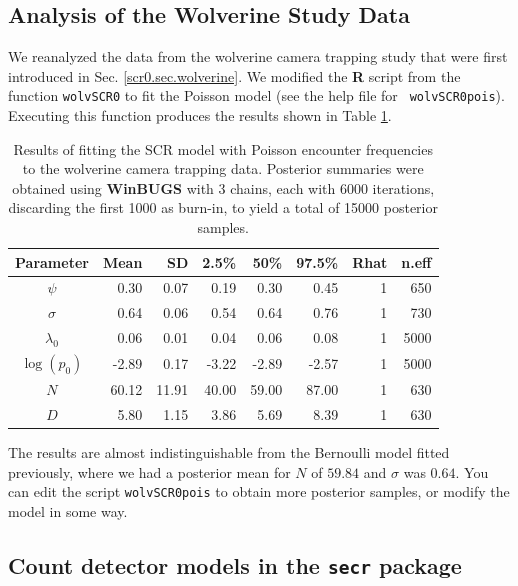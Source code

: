 

\subsection{Analysis of the Wolverine Study Data}

We reanalyzed the data from the wolverine camera trapping study that
were first introduced in Sec. \ref{scr0.sec.wolverine}.  We modified
the {\bf R} script from the function \mbox{\tt wolvSCR0} to fit the
Poisson model (see the help file for \mbox{\tt
  wolvSCR0pois}). Executing this function produces the results shown
in Table \ref{poisson-mn.tab.wolverine}.
\begin{table}
\centering
\caption{Results of fitting the SCR model with Poisson encounter
  frequencies to the wolverine camera trapping data.
Posterior summaries were obtained using {\bf WinBUGS} with
 3 chains, each with 6000 iterations, discarding the first 1000 as
 burn-in, to yield a total of 15000 posterior samples.
}
\begin{tabular}{crrrrrrr} \hline \hline
 Parameter & Mean &  SD & 2.5\% & 50\%  & 97.5\% &Rhat& n.eff \\ \hline
$\psi$     &  0.30& 0.07& 0.19 &  0.30 & 0.45& 1 &  650 \\
$\sigma$   &  0.64& 0.06& 0.54 &  0.64 & 0.76& 1 &  730 \\
$\lambda_{0}$& 0.06& 0.01& 0.04 &  0.06 & 0.08& 1&  5000\\
$\log(p_0)$  &-2.89& 0.17& -3.22& -2.89& -2.57& 1&  5000\\
$N$        & 60.12&11.91& 40.00& 59.00& 87.00& 1&   630\\
$D$        &  5.80& 1.15& 3.86 & 5.69 & 8.39 & 1&   630\\ \hline
\end{tabular}
\label{poisson-mn.tab.wolverine}
\end{table}
The results are almost indistinguishable from the Bernoulli model
fitted previously, where we had a posterior mean for $N$ of
 $59.84$ and  $\sigma$ was $0.64$. 
You can 
edit the script \mbox{\tt wolvSCR0pois} to  obtain more posterior
 samples, or modify the model in some way.


\subsection{Count detector models in the  \mbox{\tt secr} package}

